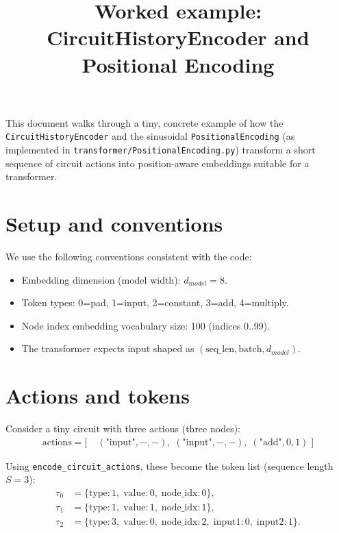\documentclass{article}
\begin{document}
\title{Worked example: CircuitHistoryEncoder and Positional Encoding}
\author{}
\date{}
\maketitle

This document walks through a tiny, concrete example of how the \texttt{CircuitHistoryEncoder} and the sinusoidal \texttt{PositionalEncoding} (as implemented in \texttt{transformer/PositionalEncoding.py}) transform a short sequence of circuit actions into position-aware embeddings suitable for a transformer.

\section*{Setup and conventions}
We use the following conventions consistent with the code:
\begin{itemize}
  \item Embedding dimension (model width): $d_{model} = 8$.
  \item Token types: 0=pad, 1=input, 2=constant, 3=add, 4=multiply.
  \item Node index embedding vocabulary size: 100 (indices 0..99).
  \item The transformer expects input shaped as $(\text{seq\_len}, \text{batch}, d_{model})$.
\end{itemize}

\section*{Actions and tokens}
Consider a tiny circuit with three actions (three nodes):
\begin{align*}
\text{actions} = [&\; (\text{"input"}, -, -), \;
                  (\text{"input"}, -, -), \;
                  (\text{"add"}, 0, 1) \;]
\end{align*}

Using \texttt{encode\_circuit\_actions}, these become the token list (sequence length $S=3$):
\begin{align*}
\tau_0 &= \{\text{type}:1,\; \text{value}:0,\; \text{node\_idx}:0\},\\
\tau_1 &= \{\text{type}:1,\; \text{value}:1,\; \text{node\_idx}:1\},\\
\tau_2 &= \{\text{type}:3,\; \text{value}:0,\; \text{node\_idx}:2,\; \text{input1}:0,\; \text{input2}:1\}.
\end{align*}
\end{document}
